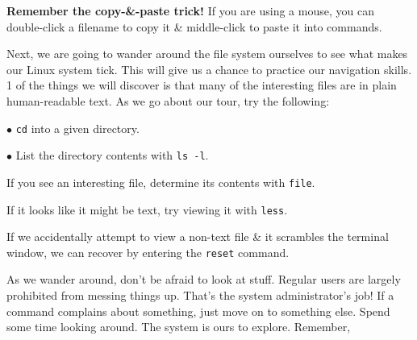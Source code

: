 \documentclass[oneside]{book}
\numberwithin{equation}{section}
\begin{document}
\textbf{Remember the copy-\&-paste trick!} If you are using a mouse, you can double-click a filename to copy it \& middle-click to paste it into commands.

Next, we are going to wander around the file system ourselves to see what makes our Linux system tick. This will give us a chance to practice our navigation skills. 1 of the things we will discover is that many of the interesting files are in plain human-readable text. As we go about our tour, try the following:
\begin{enumerate*}
	\item[$\bullet$] \texttt{cd} into a given directory.
	\item[$\bullet$] List the directory contents with \texttt{ls -l}.
	\item If you see an interesting file, determine its contents with \texttt{file}.
	\item If it looks like it might be text, try viewing it with \texttt{less}.
\end{enumerate*}
If we accidentally attempt to view a non-text file \& it scrambles the terminal window, we can recover by entering the \texttt{reset} command.

As we wander around, don't be afraid to look at stuff. Regular users are largely prohibited from messing things up. That's the system administrator's job! If a command complains about something, just move on to something else. Spend some time looking around. The system is ours to explore. Remember, 
\end{document}
